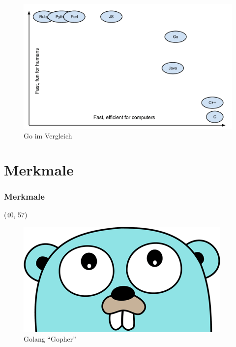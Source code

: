 \documentclass{beamer}
\begin{document}
\begin{frame}

\begin{figure}
\includegraphics[scale=0.3]{graph.png}
\caption{Go im Vergleich}
\end{figure}

\end{frame}


\section{Merkmale}
\begin{frame}
\frametitle{Merkmale}

\begin{textblock}{50}(40, 57)
\begin{figure}
\caption{Golang ``Gopher''}
\includegraphics[scale=0.35]{gopherHead.png}
\end{figure}
\end{textblock}

\end{frame}

\end{document}
